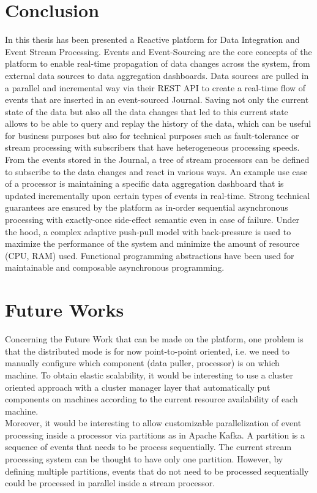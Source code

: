 \section{Conclusion}

In this thesis has been presented a Reactive platform for Data Integration and Event Stream Processing. Events and Event-Sourcing are the core concepts of the platform to enable 
real-time propagation of data changes across the system, from external data sources to data aggregation dashboards. Data sources are pulled in a parallel and incremental way via their REST API to create a real-time flow of events that are inserted in an event-sourced Journal. Saving not only the current state of the data but also all the data changes
that led to this current state allows to be able to query and replay the history of the data, which can be useful for business purposes but also for technical purposes such as fault-tolerance or stream processing with subscribers that have heterogeneous processing speeds.
From the events stored in the Journal, a tree of stream processors can be defined to subscribe to the data changes and react in various ways. An example use case of a processor is maintaining a specific data aggregation dashboard that is updated incrementally upon certain types of events in real-time. Strong technical guarantees are ensured by the platform as in-order sequential asynchronous processing with exactly-once side-effect semantic even in case of failure. Under the hood, a complex adaptive push-pull model with back-pressure is used to maximize the performance of the system and minimize the amount of resource (CPU, RAM) used. Functional programming abstractions have been used for maintainable and composable asynchronous programming.


\section{Future Works}

Concerning the Future Work that can be made on the platform, one problem is that the distributed mode is for now point-to-point oriented, i.e. we need to manually configure which component (data puller, processor) is on which machine. To obtain elastic scalability, it would be interesting to use a cluster oriented approach with a cluster manager layer that automatically put components on machines according to the current resource availability of each machine.
\\

Moreover, it would be interesting to allow customizable parallelization of event processing inside a processor via partitions as in Apache Kafka. A partition is a sequence of events that needs to be process sequentially. The current stream processing system can be thought to have only one partition. However, by defining multiple partitions, events that do not need to be processed sequentially could be processed in parallel inside a stream processor.
\\

